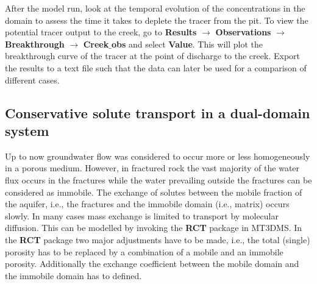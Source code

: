 After the model run, look at the temporal evolution of the concentrations 
in the domain to assess the time it takes to deplete the tracer from the pit. 
To view the potential tracer output to the creek, go to 
{\color{blue}\textbf{Results}} 
$\rightarrow$ {\color{blue}\textbf{Observations}}
$\rightarrow$ {\color{blue}\textbf{Breakthrough}}
$\rightarrow$ {\color{blue}\textbf{Creek$\_$obs}}
and select {\color{blue}\textbf{Value}}. 
This will plot the breakthrough curve of the tracer at the point of 
discharge to the creek. Export the results to a text file 
such that the data can later be used for a comparison of different cases.

\subsection{Conservative solute transport in a dual-domain system}

Up to now groundwater flow was considered to occur 
more or less homogeneously in a porous medium. 
However, in fractured rock the vast majority of the water flux occurs
in the fractures while the water prevailing outside the 
fractures can be considered as immobile.
The exchange of solutes between the mobile fraction of the aquifer, 
i.e., the fractures and the immobile domain (i.e., matrix) occurs slowly.
In many cases mass exchange is limited to transport by molecular diffusion. 
This can be modelled by invoking the {\color{blue}\textbf{RCT}} package in MT3DMS. 
In the {\color{blue}\textbf{RCT}} package two major adjustments have to be made,
i.e., the total (single) porosity has to be replaced by
a combination of a mobile and an immobile porosity.
Additionally the exchange coefficient between the mobile domain 
and the immobile domain has to defined. 

